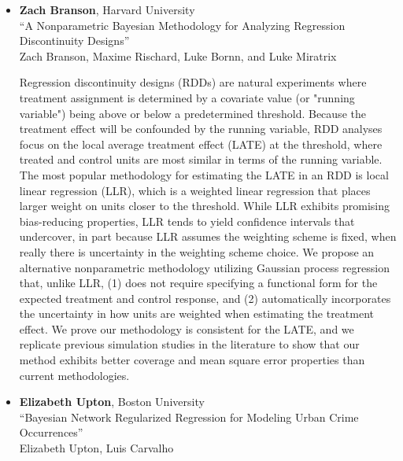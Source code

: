 \begin{itemize}
\item \textbf{Zach Branson}, Harvard University \\
``A Nonparametric Bayesian Methodology for Analyzing Regression Discontinuity Designs'' \\
Zach Branson, Maxime Rischard, Luke Bornn, and Luke Miratrix


Regression discontinuity designs (RDDs) are natural experiments where treatment assignment is determined by a covariate value (or "running variable") being above or below a predetermined threshold. Because the treatment effect will be confounded by the running variable, RDD analyses focus on the local average treatment effect (LATE) at the threshold, where treated and control units are most similar in terms of the running variable. The most popular methodology for estimating the LATE in an RDD is local linear regression (LLR), which is a weighted linear regression that places larger weight on units closer to the threshold. While LLR exhibits promising bias-reducing properties, LLR tends to yield confidence intervals that undercover, in part because LLR assumes the weighting scheme is fixed, when really there is uncertainty in the weighting scheme choice. We propose an alternative nonparametric methodology utilizing Gaussian process regression that, unlike LLR, (1) does not require specifying a functional form for the expected treatment and control response, and (2) automatically incorporates the uncertainty in how units are weighted when estimating the treatment effect.  We prove our methodology is consistent for the LATE, and we replicate previous simulation studies in the literature to show that our method exhibits better coverage and mean square error properties than current methodologies.

\item \textbf{Elizabeth Upton}, Boston University \\
``Bayesian Network Regularized Regression for Modeling Urban Crime Occurrences'' \\
Elizabeth Upton, Luis Carvalho



\end{itemize}
